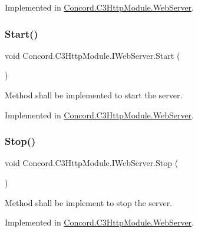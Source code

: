 Implemented in \mbox{\hyperlink{class_concord_1_1_c3_http_module_1_1_web_server_ad3121bff4e1aeaeb05a5f1636d1e7d65}{Concord.\+C3\+Http\+Module.\+Web\+Server}}.

\mbox{\label{interface_concord_1_1_c3_http_module_1_1_i_web_server_a9f361fa34fa5c93d792e32a3ce8969cf}} 
\subsubsection{\texorpdfstring{Start()}{Start()}}
{\footnotesize\ttfamily void Concord.\+C3\+Http\+Module.\+I\+Web\+Server.\+Start (\begin{DoxyParamCaption}{ }\end{DoxyParamCaption})}



Method shall be implemented to start the server. 



Implemented in \mbox{\hyperlink{class_concord_1_1_c3_http_module_1_1_web_server_ac95e30c39f5d922e6043377ccac20e6d}{Concord.\+C3\+Http\+Module.\+Web\+Server}}.

\mbox{\label{interface_concord_1_1_c3_http_module_1_1_i_web_server_a800e9a97640440f79e356cf3fa3ddbf8}} 
\subsubsection{\texorpdfstring{Stop()}{Stop()}}
{\footnotesize\ttfamily void Concord.\+C3\+Http\+Module.\+I\+Web\+Server.\+Stop (\begin{DoxyParamCaption}{ }\end{DoxyParamCaption})}



Method shall be implement to stop the server. 



Implemented in \mbox{\hyperlink{class_concord_1_1_c3_http_module_1_1_web_server_a9e75b9b9d1eb2c58a1be558bf9182087}{Concord.\+C3\+Http\+Module.\+Web\+Server}}.



